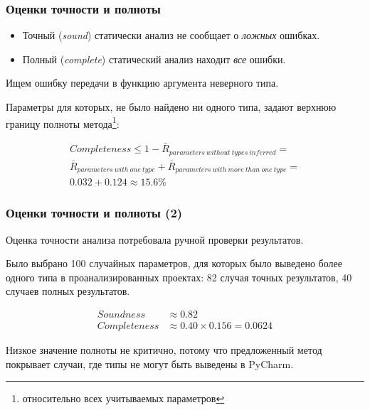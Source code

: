 \documentclass[handout]{beamer}
\begin{document}
\begin{frame}
  \frametitle{Оценки точности и полноты}

  \begin{itemize}
      \item Точный (\emph{sound}) статически анализ не сообщает о \emph{ложных} ошибках.

      \item Полный (\emph{complete}) статический анализ находит \emph{все} ошибки.
  \end{itemize}

  Ищем ошибку передачи в функцию аргумента неверного типа.

  Параметры для которых, не было найдено ни одного типа, задают верхнюю границу
  полноты метода\footnote{относительно всех учитываемых параметров}:

  \begin{multline*}
    Completeness \le 1 - \bar{R}_{parameters~without~types~inferred} = \\
    \bar{R}_{parameters~with~one~type} + \bar{R}_{parameters~with~more~than~one~type} = \\
    0.032 + 0.124 \approx 15.6\%
  \end{multline*}
    
\end{frame}

\begin{frame}
  \frametitle{Оценки точности и полноты (2)}

  Оценка точности анализа потребовала ручной проверки результатов.

  Было выбрано 100 случайных параметров, для которых было выведено более одного
  типа в проанализированных проектах: 82 случая точных результатов, 40
  случаев полных результатов.


  \begin{align*}
    Soundness& \approx 0.82 \\
    Completeness& \approx 0.40 \times 0.156 = 0.0624
  \end{align*}

  Низкое значение полноты не критично, потому что предложенный метод покрывает
  случаи, где типы не могут быть выведены в PyCharm.
    
\end{frame}
\end{document}

